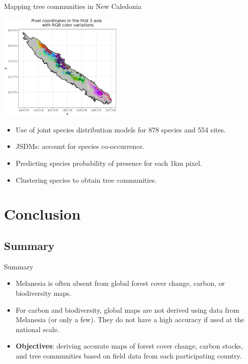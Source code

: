 \documentclass[10pt,table,dvipsnames,compress]{beamer}
\begin{document}
\begin{frame}[label={sec:orge4a9b7b}]{Mapping tree communities in New Caledonia}
\begin{center}
\includegraphics[width=6cm]{figs/biodiv/jSDM-NC.png}
\end{center}

\begin{itemize}
\item Use of joint species distribution models for 878 species and 554 sites.
\item JSDMs: account for species co-occurrence.
\item Predicting species probability of presence for each 1km pixel.
\item Clustering species to obtain tree communities.
\end{itemize}
\end{frame}

\section{Conclusion}
\label{sec:org3d1eb05}

\subsection{Summary}
\label{sec:org0e68c96}

\begin{frame}[label={sec:org6a04999}]{Summary}
\begin{itemize}
\item Melanesia is often absent from global forest cover change, carbon, or biodiversity maps.
\item For carbon and biodiversity, global maps are not derived using data from Melanesia (or only a few). They do not have a high accuracy if used at the national scale.
\item \textbf{Objectives}: deriving accurate maps of forest cover change, carbon stocks, and tree communities based on field data from each participating country.
\end{itemize}
\end{frame}
\end{document}
